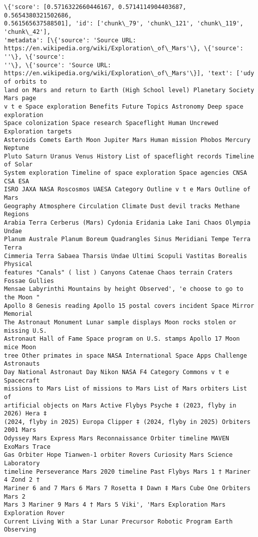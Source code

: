 \documentclass[11pt]{article}
\begin{document}
    \begin{Verbatim}[commandchars=\\\{\}]
\{'score': [0.5716322660446167, 0.5714114904403687, 0.5654380321502686,
0.561565637588501], 'id': ['chunk\_79', 'chunk\_121', 'chunk\_119', 'chunk\_42'],
'metadata': [\{'source': 'Source URL:
https://en.wikipedia.org/wiki/Exploration\_of\_Mars'\}, \{'source': ''\}, \{'source':
''\}, \{'source': 'Source URL:
https://en.wikipedia.org/wiki/Exploration\_of\_Mars'\}], 'text': ['udy of orbits to
land on Mars and return to Earth (High School level) Planetary Society Mars page
v t e Space exploration Benefits Future Topics Astronomy Deep space exploration
Space colonization Space research Spaceflight Human Uncrewed Exploration targets
Asteroids Comets Earth Moon Jupiter Mars Human mission Phobos Mercury Neptune
Pluto Saturn Uranus Venus History List of spaceflight records Timeline of Solar
System exploration Timeline of space exploration Space agencies CNSA CSA ESA
ISRO JAXA NASA Roscosmos UAESA Category Outline v t e Mars Outline of Mars
Geography Atmosphere Circulation Climate Dust devil tracks Methane Regions
Arabia Terra Cerberus (Mars) Cydonia Eridania Lake Iani Chaos Olympia Undae
Planum Australe Planum Boreum Quadrangles Sinus Meridiani Tempe Terra Terra
Cimmeria Terra Sabaea Tharsis Undae Ultimi Scopuli Vastitas Borealis Physical
features "Canals" ( list ) Canyons Catenae Chaos terrain Craters Fossae Gullies
Mensae Labyrinthi Mountains by height Observed', 'e choose to go to the Moon "
Apollo 8 Genesis reading Apollo 15 postal covers incident Space Mirror Memorial
The Astronaut Monument Lunar sample displays Moon rocks stolen or missing U.S.
Astronaut Hall of Fame Space program on U.S. stamps Apollo 17 Moon mice Moon
tree Other primates in space NASA International Space Apps Challenge Astronauts
Day National Astronaut Day Nikon NASA F4 Category Commons v t e Spacecraft
missions to Mars List of missions to Mars List of Mars orbiters List of
artificial objects on Mars Active Flybys Psyche ‡ (2023, flyby in 2026) Hera ‡
(2024, flyby in 2025) Europa Clipper ‡ (2024, flyby in 2025) Orbiters 2001 Mars
Odyssey Mars Express Mars Reconnaissance Orbiter timeline MAVEN ExoMars Trace
Gas Orbiter Hope Tianwen-1 orbiter Rovers Curiosity Mars Science Laboratory
timeline Perseverance Mars 2020 timeline Past Flybys Mars 1 † Mariner 4 Zond 2 †
Mariner 6 and 7 Mars 6 Mars 7 Rosetta ‡ Dawn ‡ Mars Cube One Orbiters Mars 2
Mars 3 Mariner 9 Mars 4 † Mars 5 Viki', 'Mars Exploration Mars Exploration Rover
Current Living With a Star Lunar Precursor Robotic Program Earth Observing

\end{Verbatim}
\end{document}
